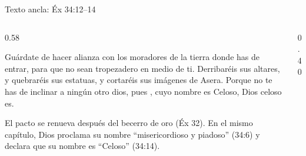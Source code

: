 \begin{frame}{Texto ancla: Éx 34:12--14}
\begin{columns}[c,onlytextwidth]
\begin{column}{0.58\textwidth}
\begin{cita}Guárdate de hacer alianza con los moradores de la tierra donde has de entrar, para que no sean tropezadero en medio de ti. Derribaréis sus altares, y quebraréis sus estatuas, y cortaréis sus imágenes de Asera. Porque no te has de inclinar a ningún otro dios, pues \SENOR, cuyo nombre es Celoso, Dios celoso es.\end{cita}
\small El pacto se renueva después del becerro de oro (Éx 32). En el mismo capítulo, Dios proclama su nombre ``misericordioso y piadoso'' (34:6) y declara que su nombre es ``Celoso'' (34:14).
\end{column}
\begin{column}{0.40\textwidth}\end{column}
\end{columns}
\end{frame}

